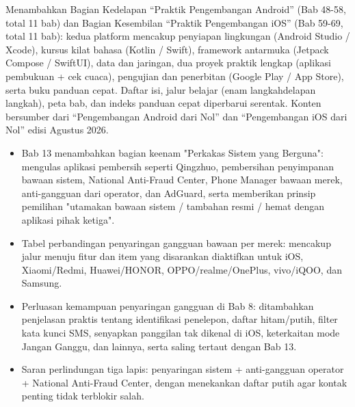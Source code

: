 Menambahkan Bagian Kedelapan “Praktik Pengembangan Android” (Bab 48-58, total 11 bab) dan Bagian Kesembilan “Praktik Pengembangan iOS” (Bab 59-69, total 11 bab): kedua platform mencakup penyiapan lingkungan (Android Studio / Xcode), kursus kilat bahasa (Kotlin / Swift), framework antarmuka (Jetpack Compose / SwiftUI), data dan jaringan, dua proyek praktik lengkap (aplikasi pembukuan + cek cuaca), pengujian dan penerbitan (Google Play / App Store), serta buku panduan cepat. Daftar isi, jalur belajar (enam langkahdelapan langkah), peta bab, dan indeks panduan cepat diperbarui serentak. Konten bersumber dari “Pengembangan Android dari Nol” dan “Pengembangan iOS dari Nol” edisi Agustus 2026.


\begin{itemize}
  \item Bab 13 menambahkan bagian keenam "Perkakas Sistem yang Berguna": mengulas aplikasi pembersih seperti Qingzhuo, pembersihan penyimpanan bawaan sistem, National Anti-Fraud Center, Phone Manager bawaan merek, anti-gangguan dari operator, dan AdGuard, serta memberikan prinsip pemilihan "utamakan bawaan sistem / tambahan resmi / hemat dengan aplikasi pihak ketiga".
  \item Tabel perbandingan penyaringan gangguan bawaan per merek: mencakup jalur menuju fitur dan item yang disarankan diaktifkan untuk iOS, Xiaomi/Redmi, Huawei/HONOR, OPPO/realme/OnePlus, vivo/iQOO, dan Samsung.
  \item Perluasan kemampuan penyaringan gangguan di Bab 8: ditambahkan penjelasan praktis tentang identifikasi penelepon, daftar hitam/putih, filter kata kunci SMS, senyapkan panggilan tak dikenal di iOS, keterkaitan mode Jangan Ganggu, dan lainnya, serta saling tertaut dengan Bab 13.
  \item Saran perlindungan tiga lapis: penyaringan sistem + anti-gangguan operator + National Anti-Fraud Center, dengan menekankan daftar putih agar kontak penting tidak terblokir salah.
\end{itemize}


